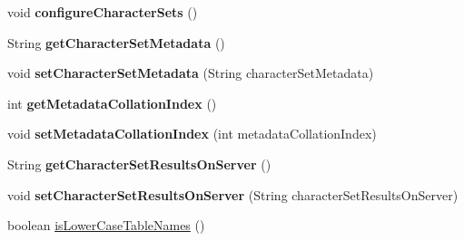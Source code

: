 \begin{DoxyCompactItemize}
\item 
\mbox{\label{interfacecom_1_1mysql_1_1cj_1_1protocol_1_1_server_session_abcad1a4dec7e1822b0d4c52fdb0feb7d}} 
void {\bfseries configure\+Character\+Sets} ()
\item 
\mbox{\label{interfacecom_1_1mysql_1_1cj_1_1protocol_1_1_server_session_a3aeeeb80107544ed93be2c73124bf53f}} 
String {\bfseries get\+Character\+Set\+Metadata} ()
\item 
\mbox{\label{interfacecom_1_1mysql_1_1cj_1_1protocol_1_1_server_session_a494d0e19dd3695aa635d2696d19f0368}} 
void {\bfseries set\+Character\+Set\+Metadata} (String character\+Set\+Metadata)
\item 
\mbox{\label{interfacecom_1_1mysql_1_1cj_1_1protocol_1_1_server_session_af72447373f7ae77b56c5563c2922e9db}} 
int {\bfseries get\+Metadata\+Collation\+Index} ()
\item 
\mbox{\label{interfacecom_1_1mysql_1_1cj_1_1protocol_1_1_server_session_a9472dd2bebc57f2dc9f94bae07ac6e9e}} 
void {\bfseries set\+Metadata\+Collation\+Index} (int metadata\+Collation\+Index)
\item 
\mbox{\label{interfacecom_1_1mysql_1_1cj_1_1protocol_1_1_server_session_a8c4da1a076a82273ca497c1914faf960}} 
String {\bfseries get\+Character\+Set\+Results\+On\+Server} ()
\item 
\mbox{\label{interfacecom_1_1mysql_1_1cj_1_1protocol_1_1_server_session_a30cdcfb3f1137a3b74963b0ccdfd1014}} 
void {\bfseries set\+Character\+Set\+Results\+On\+Server} (String character\+Set\+Results\+On\+Server)
\item 
boolean \mbox{\hyperlink{interfacecom_1_1mysql_1_1cj_1_1protocol_1_1_server_session_a48d31222ed61fa5971aae698a5ff9fdf}{is\+Lower\+Case\+Table\+Names}} ()
\item 
\mbox{\label{interfacecom_1_1mysql_1_1cj_1_1protocol_1_1_server_session_af13bb03c427785628050cb4466f6de24}} 

\end{DoxyCompactItemize}
